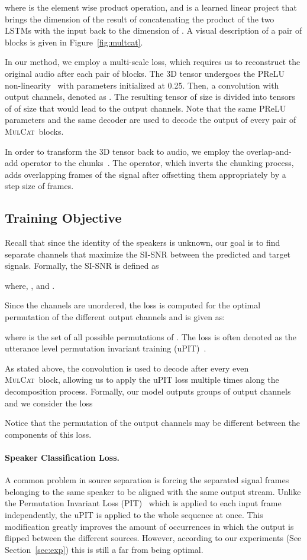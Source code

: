 \documentclass{article}
\newcommand{\ours}{\textsc{MulCat}~}
\begin{document}
where  is the element wise product operation, and  is a learned linear project that brings the dimension of the result of concatenating the product of the two LSTMs with the input  back to the dimension of . A visual description of a pair of blocks is given in Figure~\ref{fig:multcat}.

In our method, we employ a multi-scale loss, which requires us to reconstruct the original audio after each pair of blocks. The 3D tensor undergoes the PReLU non-linearity~\cite{he2015delving} with parameters initialized at 0.25. Then, a  convolution with  output channels, denoted as . The resulting tensor of size  is divided into  tensors of of size  that would lead to the  output channels. Note that the same PReLU parameters and the same decoder  are used to decode the output of every pair of \ours blocks.

In order to transform the 3D tensor back to audio, we employ the overlap-and-add operator to the  chunks~\cite{rabiner1975theory}. The operator, which inverts the chunking process, adds overlapping frames of the signal after offsetting them appropriately by a step size of  frames.

\subsection{Training Objective}
Recall that since the identity of the speakers is unknown, our goal is to find  separate channels  that maximize the SI-SNR between the predicted and target signals. Formally, the SI-SNR is defined as

where, , and . 

Since the channels are unordered, the loss is computed for the optimal permutation  of the  different output channels and is given as:

where  is the set of all possible permutations of . 
The loss  is often denoted as the utterance level permutation invariant training (uPIT)~\cite{kolbaek2017multitalker}. 

As stated above, the convolution  is used to decode after every even \ours block, allowing us to apply the uPIT loss multiple times along the decomposition process. Formally, our model outputs  groups of output channels  and we consider the loss

Notice that the permutation of  the output channels may be different between the components of this loss.

\paragraph{Speaker Classification Loss.} 
A common problem in source separation is forcing the separated signal frames belonging to the same speaker to be aligned with the same output stream. Unlike the Permutation Invariant Loss (PIT)~\cite{yu2017permutation} which is applied to each input frame independently, the uPIT is applied to the whole sequence at once. This modification greatly improves the amount of occurrences in which the output is flipped between the different sources. However, according to our experiments (See Section~\ref{sec:exp}) this is still a far from being optimal. 
\end{document}
